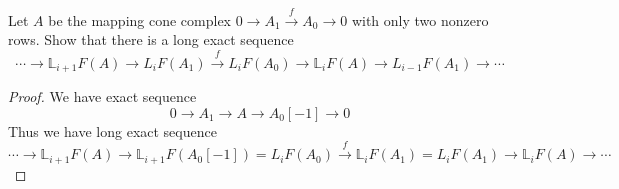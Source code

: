 \documentclass{article}
\newenvironment{exercise}[2][Exercise]{\begin{trivlist}
\item[\hskip \labelsep {\bfseries #1}\hskip \labelsep {\bfseries #2.}]}{\end{trivlist}}
\theoremstyle{definition}
\theoremstyle{remark}
\theoremstyle{definition}
\begin{document}
\begin{exercise}{\textbf{5.7.6}}
Let $A$ be the mapping cone complex $0\to A_1\xrightarrow fA_0\to0$ with only two nonzero rows. Show that there is a long exact sequence
\[\cdots\to \mathbb L_{i+1}F(A)\to L_{i}F(A_1)\xrightarrow fL_iF(A_0)\to\mathbb L_iF(A)\to L_{i-1}F(A_1)\to\cdots\]
\end{exercise}

\begin{proof}
We have exact sequence
\[0\to A_1\to A\to A_0[-1]\to0\]
Thus we have long exact sequence
\[\cdots\to\mathbb L_{i+1}F(A)\to\mathbb L_{i+1}F(A_0[-1])=L_iF(A_0)\xrightarrow f\mathbb L_iF(A_1)=L_iF(A_1)\to\mathbb L_iF(A)\to\cdots\]
\end{proof}
\end{document}
